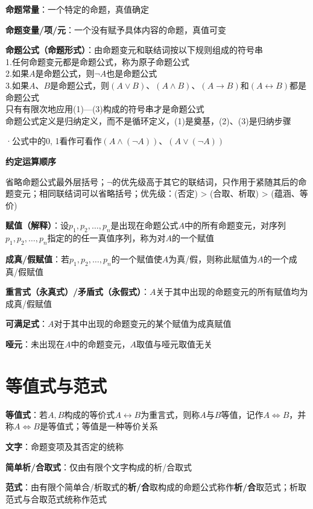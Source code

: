 \textbf{命题常量}：一个特定的命题，真值确定

\textbf{命题变量/项/元}：一个没有赋予具体内容的命题，真值可变

\textbf{命题公式（命题形式）}：由命题变元和联结词按以下规则组成的符号串\\
1.任何命题变元都是命题公式，称为原子命题公式\\
2.如果$A$是命题公式，则$\lnot A$也是命题公式\\
3.如果$A$、$B$是命题公式，则$(A \vee B)$、$(A \wedge B)$、$(A \rightarrow B)$和$(A \leftrightarrow B)$都是命题公式\\
只有有限次地应用(1)—(3)构成的符号串才是命题公式\\
命题公式定义是归纳定义，而不是循环定义，(1)是奠基，(2)、(3)是归纳步骤

·公式中的0, 1看作可看作$(A \wedge (\lnot A))$、$(A \vee (\lnot A))$

\textbf{约定运算顺序}

省略命题公式最外层括号；$\lnot$的优先级高于其它的联结词，只作用于紧随其后的命题变元；相同联结词可以省略括号；优先级：(否定) > (合取、析取) > (蕴涵、等价)

\textbf{赋值（解释）}：设$p_1, p_2, \ldots, p_n$是出现在命题公式$A$中的所有命题变元，对序列$p_1, p_2, \ldots, p_n$指定的的任一真值序列，称为对$A$的一个赋值

\textbf{成真/假赋值}：若$p_1, p_2, \ldots, p_n$的一个赋值使$A$为真/假，则称此赋值为$A$的一个成真/假赋值

\textbf{重言式（永真式）/矛盾式（永假式）}：$A$关于其中出现的命题变元的所有赋值均为成真/假赋值

\textbf{可满足式}：$A$对于其中出现的命题变元的某个赋值为成真赋值

\textbf{哑元}：未出现在$A$中的命题变元，$A$取值与哑元取值无关

\section*{等值式与范式}

\textbf{等值式}：若$A, B$构成的等价式$A \leftrightarrow B$为重言式，则称$A$与$B$等值，记作$A \Leftrightarrow B$，并称$A \Leftrightarrow B$是等值式；等值是一种等价关系

\textbf{文字}：命题变项及其否定的统称

\textbf{简单析/合取式}：仅由有限个文字构成的析/合取式

\textbf{范式}：由有限个简单合/析取式的\textbf{析/合}取构成的命题公式称作\textbf{析/合}取范式；析取范式与合取范式统称作范式

